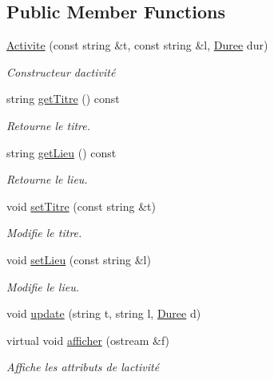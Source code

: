 \subsection*{Public Member Functions}
\begin{DoxyCompactItemize}
\item 
\hyperlink{class_activite_a06098c0f62244f4b60d250325b738094}{Activite} (const string \&t, const string \&l, \hyperlink{class_t_i_m_e_1_1_duree}{Duree} dur)
\begin{DoxyCompactList}\small\item\em Constructeur d\textquotesingle{}activité \end{DoxyCompactList}\item 
string \hyperlink{class_activite_ab0e1e83e41d35906dffc14530826075e}{get\+Titre} () const 
\begin{DoxyCompactList}\small\item\em Retourne le titre. \end{DoxyCompactList}\item 
string \hyperlink{class_activite_a695b4d43546d5715977381a7070d66d6}{get\+Lieu} () const 
\begin{DoxyCompactList}\small\item\em Retourne le lieu. \end{DoxyCompactList}\item 
void \hyperlink{class_activite_a510383c92c6d87877e074032fa8519ee}{set\+Titre} (const string \&t)
\begin{DoxyCompactList}\small\item\em Modifie le titre. \end{DoxyCompactList}\item 
void \hyperlink{class_activite_a1240cc984d5508b99feb99175bc05750}{set\+Lieu} (const string \&l)
\begin{DoxyCompactList}\small\item\em Modifie le lieu. \end{DoxyCompactList}\item 
void \hyperlink{class_activite_a513d49fbf721923d0db22a646ec606be}{update} (string t, string l, \hyperlink{class_t_i_m_e_1_1_duree}{Duree} d)
\item 
virtual void \hyperlink{class_activite_acf748b87edc5e4a5b78bd5e9364946f3}{afficher} (ostream \&f)
\begin{DoxyCompactList}\small\item\em Affiche les attributs de l\textquotesingle{}activité \end{DoxyCompactList}\end{DoxyCompactItemize}


